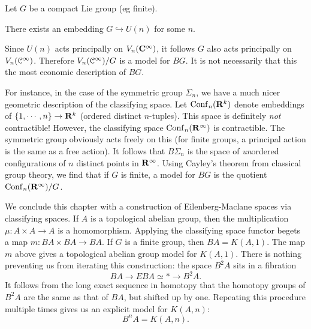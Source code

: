 Let $G$ be a compact Lie group (eg finite).
\begin{theorem}
    There exists an embedding $G\hookrightarrow U(n)$ for some $n$.
\end{theorem}
Since $U(n)$ acts principally on $V_n(\mathbf C^\infty)$, it follows $G$ also acts
principally on $V_n(\mathcal C^\infty)$. Therefore $V_n(\mathcal C^\infty)/G$ is a model for
$BG$. It is not necessarily that this the most economic description of $BG$.

For instance, in the case of the symmetric group $\Sigma_n$, we have a much
nicer geometric description of the classifying space. Let
$\mathrm{Conf}_n(\mathbf R^k)$ denote embeddings of $\{1,\cdots,n\}\to \mathbf R^k$
(ordered distinct $n$-tuples). This space is definitely \emph{not}
contractible! However, the classifying space $\mathrm{Conf}_n(\mathbf R^\infty)$ is
contractible. The symmetric group obviously acts freely on this (for finite
groups, a principal action is the same as a free action). It follows that
$B\Sigma_n$ is the space of \emph{un}ordered configurations of $n$ distinct
points in $\mathbf R^\infty$. Using Cayley's theorem from classical group theory, we
find that if $G$ is finite, a model for $BG$ is the quotient
$\mathrm{Conf}_n(\mathbf R^\infty)/G$.

We conclude this chapter with a construction of Eilenberg-Maclane spaces via
classifying spaces. If $A$ is a topological abelian group, then the
multiplication $\mu:A\times A\to A$ is a homomorphism. Applying the classifying
space functor begets a map $m:BA\times BA\to BA$. If $G$ is a finite group, then
$BA = K(A, 1)$. The map $m$ above gives a topological abelian group model for
$K(A, 1)$. There is nothing preventing us from iterating this construction: the
space $B^2 A$ sits in a fibration
$$BA \to EBA\simeq \ast \to B^2 A.$$
It follows from the long exact sequence in homotopy that the homotopy groups of
$B^2 A$ are the same as that of $BA$, but shifted up by one. Repeating this
procedure multiple times gives us an explicit model for $K(A,n)$:
$$B^n A = K(A, n).$$
